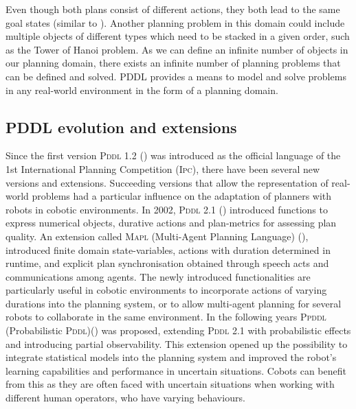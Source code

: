 Even though both plans consist of different actions, they both lead to the same goal states (similar to ).
Another planning problem in this domain could include multiple objects of different types which need to be stacked in a given order, such as the Tower of Hanoi problem.
As we can define an infinite number of objects in our planning domain, there exists an infinite number of planning problems that can be defined and solved. 
PDDL provides a means to model and solve problems in any real-world environment in the form of a planning domain. 


\subsection{PDDL evolution and extensions}\label{subsec:PDDL evolution}

Since the first version \textsc{Pddl} 1.2 (\cite{mcdermott1998pddl}) was introduced as the official language of the 1st International Planning Competition (\textsc{Ipc}), there have been several new versions and extensions.
Succeeding versions that allow the representation of real-world problems had a particular influence on the adaptation of planners with robots in cobotic environments. 
In 2002, \textsc{Pddl} 2.1 (\cite{fox2003pddl2}) introduced functions to express numerical objects, durative actions and plan-metrics for assessing plan quality.
An extension called \textsc{Mapl} (Multi-Agent Planning Language) (\cite{brenner2003multiagent}), introduced finite domain state-variables, actions with duration determined in runtime, and explicit plan synchronisation obtained through speech acts and communications among agents. 
The newly introduced functionalities are particularly useful in cobotic environments to incorporate actions of varying durations into the planning system, or to allow multi-agent planning for several robots to collaborate in the same environment.
In the following years \textsc{Ppddl} (Probabilistic \textsc{Pddl})(\cite{younes:04a}) was proposed, extending \textsc{Pddl} 2.1 with probabilistic effects and introducing partial observability. 
This extension opened up the possibility to integrate statistical models into the planning system and improved the robot's learning capabilities and performance in uncertain situations. 
Cobots can benefit from this as they are often faced with uncertain situations when working with different human operators, who have varying behaviours.

